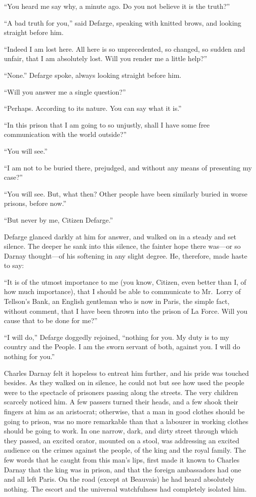 ``You heard me say why, a minute ago.  Do you not believe it is the
truth?''

``A bad truth for you,'' said Defarge, speaking with knitted brows,
and looking straight before him.

``Indeed I am lost here.  All here is so unprecedented, so changed,
so sudden and unfair, that I am absolutely lost.  Will you render me
a little help?''

``None.''  Defarge spoke, always looking straight before him.

``Will you answer me a single question?''

``Perhaps.  According to its nature.  You can say what it is.''

``In this prison that I am going to so unjustly, shall I have some
free communication with the world outside?''

``You will see.''

``I am not to be buried there, prejudged, and without any means of
presenting my case?''

``You will see.  But, what then?  Other people have been similarly
buried in worse prisons, before now.''

``But never by me, Citizen Defarge.''

Defarge glanced darkly at him for answer, and walked on in a steady
and set silence.  The deeper he sank into this silence, the fainter
hope there was---or so Darnay thought---of his softening in any slight
degree. He, therefore, made haste to say:

``It is of the utmost importance to me (you know, Citizen, even better
than I, of how much importance), that I should be able to communicate
to Mr.\ Lorry of Tellson's Bank, an English gentleman who is now in
Paris, the simple fact, without comment, that I have been thrown into
the prison of La Force.  Will you cause that to be done for me?''

``I will do,'' Defarge doggedly rejoined, ``nothing for you.  My duty is
to my country and the People.  I am the sworn servant of both,
against you. I will do nothing for you.''

Charles Darnay felt it hopeless to entreat him further, and his pride
was touched besides.  As they walked on in silence, he could not but
see how used the people were to the spectacle of prisoners passing
along the streets.  The very children scarcely noticed him.  A few
passers turned their heads, and a few shook their fingers at him as
an aristocrat; otherwise, that a man in good clothes should be going
to prison, was no more remarkable than that a labourer in working
clothes should be going to work.  In one narrow, dark, and dirty
street through which they passed, an excited orator, mounted on a stool,
was addressing an excited audience on the crimes against the people,
of the king and the royal family.  The few words that he caught from
this man's lips, first made it known to Charles Darnay that the king
was in prison, and that the foreign ambassadors had one and all left
Paris.  On the road (except at Beauvais) he had heard absolutely nothing.
The escort and the universal watchfulness had completely isolated him.

